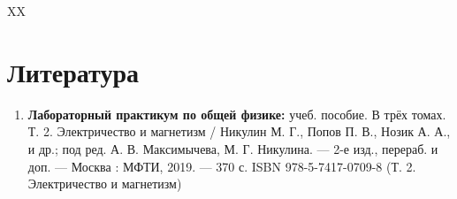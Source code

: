 \documentclass[a4paper, 12pt]{article}%
\begin{document}
XX
 

\section{Литература}

\begin{enumerate}
\item \textbf{Лабораторный практикум по общей физике:} учеб. пособие. В трёх томах. Т. 2. Электричество и магнетизм /
Никулин М. Г., Попов П. В., Нозик А. А., и др.; под ред. А. В. Мак­симычева, М. Г. Никулина. — 2-е изд., перераб. и доп. — Москва : МФТИ, 2019. — 370 с.
ISBN 978-5-7417-0709-8 (Т. 2. Электричество и магнетизм)
\end{enumerate}		
		
\end{document}
